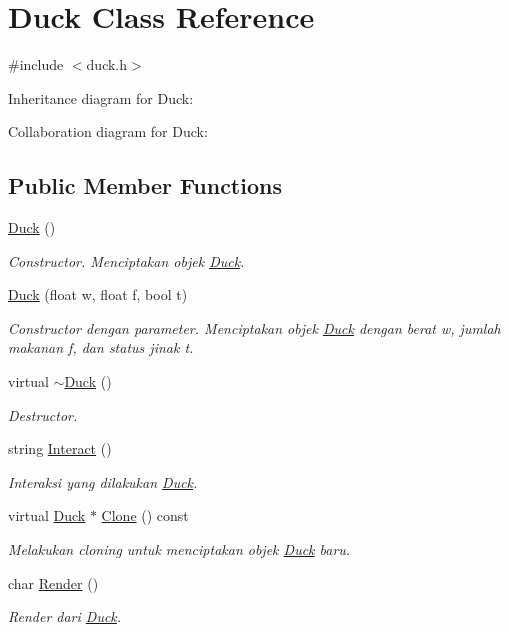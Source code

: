 \hypertarget{classDuck}{}\section{Duck Class Reference}
\label{classDuck}


{\ttfamily \#include $<$duck.\+h$>$}



Inheritance diagram for Duck\+:


Collaboration diagram for Duck\+:
\subsection*{Public Member Functions}
\begin{DoxyCompactItemize}
\item 
\hyperlink{classDuck_a65753b7b6eb80c4639f6bf165b8db9a6}{Duck} ()
\begin{DoxyCompactList}\small\item\em Constructor. Menciptakan objek \hyperlink{classDuck}{Duck}. \end{DoxyCompactList}\item 
\hyperlink{classDuck_ac66ea5a4f3b6555e818ff743005f1c38}{Duck} (float w, float f, bool t)
\begin{DoxyCompactList}\small\item\em Constructor dengan parameter. Menciptakan objek \hyperlink{classDuck}{Duck} dengan berat w, jumlah makanan f, dan status jinak t. \end{DoxyCompactList}\item 
virtual \hyperlink{classDuck_a073eb979ff45a938fde4cf769f5e579b}{$\sim$\+Duck} ()
\begin{DoxyCompactList}\small\item\em Destructor. \end{DoxyCompactList}\item 
string \hyperlink{classDuck_a9355aa821755703c02ac96e49692eaea}{Interact} ()
\begin{DoxyCompactList}\small\item\em Interaksi yang dilakukan \hyperlink{classDuck}{Duck}. \end{DoxyCompactList}\item 
virtual \hyperlink{classDuck}{Duck} $\ast$ \hyperlink{classDuck_ae3ff98b443c887f37ce63e3ed2e3a690}{Clone} () const 
\begin{DoxyCompactList}\small\item\em Melakukan cloning untuk menciptakan objek \hyperlink{classDuck}{Duck} baru. \end{DoxyCompactList}\item 
char \hyperlink{classDuck_a8453f95adcf2e7ff1b35a1a9d9948510}{Render} ()
\begin{DoxyCompactList}\small\item\em Render dari \hyperlink{classDuck}{Duck}. \end{DoxyCompactList}\end{DoxyCompactItemize}
